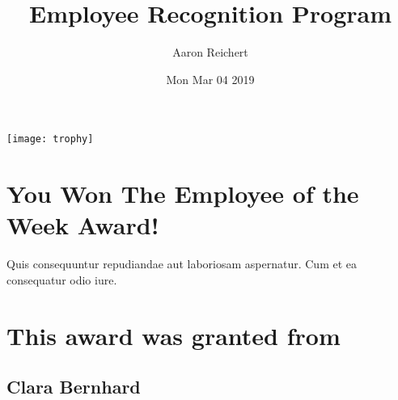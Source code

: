 \documentclass[12pt, letterpaper]{article}
\title{Employee Recognition Program}
\author{Aaron Reichert}
\date{Mon Mar 04 2019}
\begin{document}
\maketitle
\begin{center}
\texttt{[image: trophy]}
\section*{You Won The Employee of the Week Award!}
Quis consequuntur repudiandae aut laboriosam aspernatur. Cum et ea consequatur odio iure.
\section*{This award was granted from}
\subsection*{Clara Bernhard}
\end{center}
\end{document}
